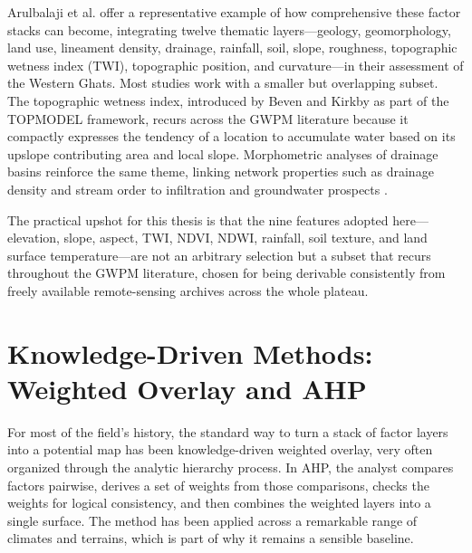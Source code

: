 Arulbalaji et al. \cite{arulbalaji2019gisahp} offer a representative example of
how comprehensive these factor stacks can become, integrating twelve thematic
layers---geology, geomorphology, land use, lineament density, drainage, rainfall,
soil, slope, roughness, topographic wetness index (TWI), topographic position,
and curvature---in their assessment of the Western Ghats. Most studies work with
a smaller but overlapping subset. The topographic wetness index, introduced by
Beven and Kirkby \cite{beven1979topmodel} as part of the TOPMODEL framework,
recurs across the GWPM literature because it compactly expresses the tendency of
a location to accumulate water based on its upslope contributing area and local
slope. Morphometric analyses of drainage basins reinforce the same theme, linking
network properties such as drainage density and stream order to infiltration and
groundwater prospects \cite{mahala2019morphometric,kumar2018morphometric}.

The practical upshot for this thesis is that the nine features adopted here---
elevation, slope, aspect, TWI, NDVI, NDWI, rainfall, soil texture, and land
surface temperature---are not an arbitrary selection but a subset that recurs
throughout the GWPM literature, chosen for being derivable consistently from
freely available remote-sensing archives across the whole plateau.

\section{Knowledge-Driven Methods: Weighted Overlay and AHP}
\label{sec:lit_ahp}

For most of the field's history, the standard way to turn a stack of factor
layers into a potential map has been knowledge-driven weighted overlay, very
often organized through the analytic hierarchy process. In AHP, the analyst
compares factors pairwise, derives a set of weights from those comparisons,
checks the weights for logical consistency, and then combines the weighted layers
into a single surface. The method has been applied across a remarkable range of
climates and terrains, which is part of why it remains a sensible baseline.

